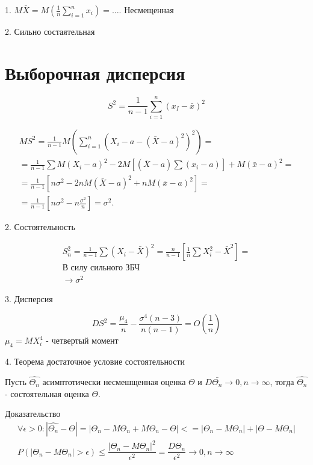 \documentclass[12pt, oneside]{book}
\begin{document}
  1. $M \bar{X} = M(\frac{1}{n} \sum\limits_{i=1}^{n} x_i) = \dots$. Несмещенная

  2. Сильно состаятельная


  \section{Выборочная дисперсия}

  $$ S^2 = \frac{1}{n-1} \sum\limits_{i=1}^{n} \left(x_I-\bar{x}\right)^2 $$

  \begin{multline}
    M S^2 = \frac{1}{n-1} M(\sum_{i=1}^{n} (X_i - a - (\bar{X} - a)^2)^2 ) = \\
    = \frac{1}{n-1} \sum M (X_i-a)^2 - 2 M[ (\bar{X} - a) \sum (x_i - a) ] + M (\bar{x} -a)^2 = \\
    = \frac{1}{n-1} \left[ n \sigma^2 - 2 n M(\bar{X}-a)^2 + n M (\bar{x}-a)^2 \right] = \\
    = \frac{1}{n-1} \left[ n \sigma^2 - n \frac{\sigma^2}{n} \right] = \sigma^2.
  \end{multline}

  2. Состоятельность 

  \begin{multline*}
    S_n^2 = \frac{1}{n-1} \sum (X_i - \bar{X})^2 = \frac{n}{n-1} \left[ \frac{1}{n} \sum X_i^2 - \bar{X}^2 \right] = \\
    \text{В силу сильного ЗБЧ} \\
    \to \sigma^2
  \end{multline*}

  3. Дисперсия

   
  $$D S^2 = \dfrac{\mu_4}{n} - \dfrac{\sigma^4 (n-3)}{n (n-1)} = O \left(\frac{1}{n} \right)$$
  $\mu_4 = M X_i^4$ - четвертый момент

  4. Теорема достаточное условие состоятельности

  Пусть $\hat{\Theta_n}$ асимптотически несмешщенная оценка $\Theta$ и $D \bar{\Theta_n} \to 0, n \to \infty$, тогда $\hat{\Theta_n}$ - состоятельная оценка $\Theta$.

  Доказательство
  \begin{multline*}
    \forall \epsilon > 0: | \hat{\Theta_n} - \Theta| = |\Theta_n - M \Theta_n + M \Theta_n - \Theta| <= |\Theta_n - M\Theta_n| + | \Theta - M \Theta_n | \\
    P( | \Theta_n - M \Theta_n| > \epsilon) \leqslant \dfrac{|\Theta_n - M \Theta_n| ^2} {\epsilon^2} =  \dfrac{D \Theta_n} {\epsilon^2} \to 0, n \to \infty
  \end{multline*}
\end{document}
